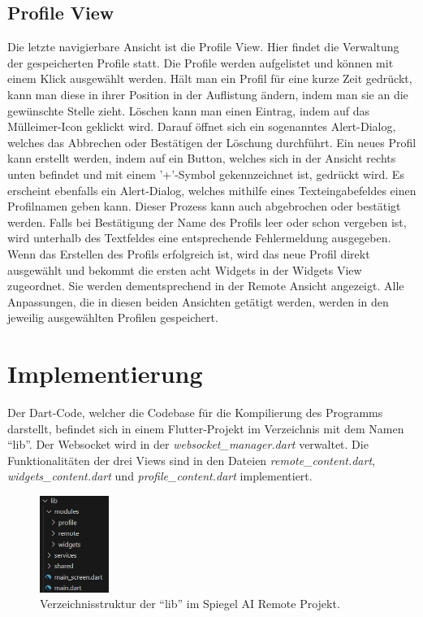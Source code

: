 \subsection{Profile View}
Die letzte navigierbare Ansicht ist die Profile View. Hier findet die Verwaltung der gespeicherten Profile statt. Die Profile werden aufgelistet und können mit einem Klick ausgewählt werden. Hält man ein Profil für eine kurze Zeit gedrückt, kann man diese in ihrer Position in der Auflistung ändern, indem man sie an die gewünschte Stelle zieht. Löschen kann man einen Eintrag, indem auf das Mülleimer-Icon geklickt wird. Darauf öffnet sich ein sogenanntes Alert-Dialog, welches das Abbrechen oder Bestätigen der Löschung durchführt. Ein neues Profil kann erstellt werden, indem auf ein Button, welches sich in der Ansicht rechts unten befindet und mit einem '+'-Symbol gekennzeichnet ist, gedrückt wird. Es erscheint ebenfalls ein Alert-Dialog, welches mithilfe eines Texteingabefeldes einen Profilnamen geben kann. Dieser Prozess kann auch abgebrochen oder bestätigt werden. Falls bei Bestätigung der Name des Profils leer oder schon vergeben ist, wird unterhalb des Textfeldes eine entsprechende Fehlermeldung ausgegeben. Wenn das Erstellen des Profils erfolgreich ist, wird das neue Profil direkt ausgewählt und bekommt die ersten acht Widgets in der Widgets View zugeordnet. Sie werden dementsprechend in der Remote Ansicht angezeigt. Alle Anpassungen, die in diesen beiden Ansichten getätigt werden, werden in den jeweilig ausgewählten Profilen gespeichert.

\section{Implementierung}
Der Dart-Code, welcher die Codebase für die Kompilierung des Programms darstellt, befindet sich in einem Flutter-Projekt im Verzeichnis mit dem Namen \enquote{lib}. Der Websocket wird in der \textit{websocket\_manager.dart} verwaltet. Die Funktionalitäten der drei Views sind in den Dateien \textit{remote\_content.dart}, \textit{widgets\_content.dart} und \textit{profile\_content.dart} implementiert.
\begin{figure}[h]
    \centering
    \includegraphics[width=0.2\textwidth]{pictures/flutter_directories.png}
    \captionsetup{justification=centering, labelformat=simple, singlelinecheck=false}
    \caption{Verzeichnisstruktur der \enquote{lib} im Spiegel AI Remote Projekt.}
    \label{fig:flutter_directories}
\end{figure}

